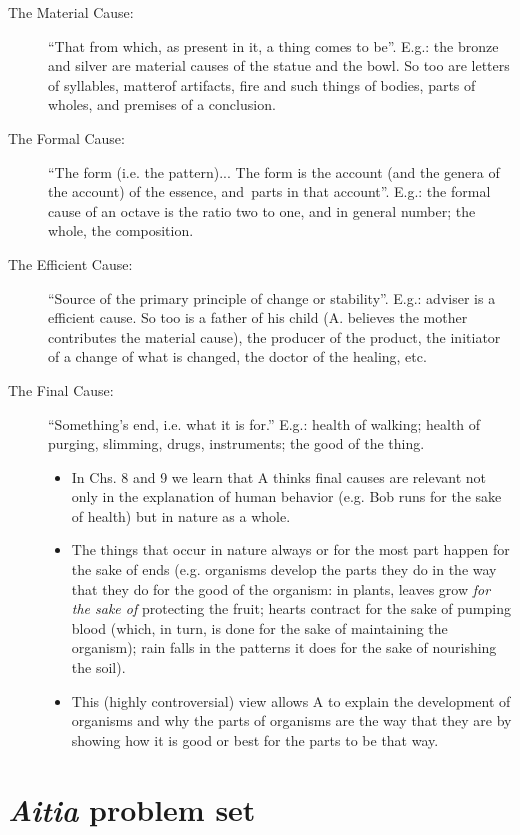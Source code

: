 \documentclass[oneside]{article}
\begin{document}
\begin{description}
\item[The Material Cause:] ``That from which, as present in it, a thing comes to be''. E.g.: the bronze and silver are material causes of the statue and the bowl. So too are letters of syllables, matterof artifacts, fire and such things of bodies, parts of wholes, and premises of a conclusion.
\item[The Formal Cause:] ``The form (i.e. the pattern)... The form is the account (and the genera of the account) of the essence, and\ parts in that account''. E.g.: the  formal cause of an octave is the ratio two to one, and in general number; the whole, the composition.
\item[The Efficient Cause:] ``Source of the primary principle of change or stability''. E.g.: adviser is a efficient cause. So too is a father of his child (A. believes the mother contributes the material cause), the producer of the product, the initiator of a change of what is changed, the doctor of the healing, etc.

\item [The Final Cause:] ``Something's end, i.e. what it is for.'' E.g.: health of walking; health of purging, slimming, drugs, instruments; the good of the thing.
\begin{itemize}
\item  In Chs. 8 and 9 we learn that A thinks final causes are relevant not only in the explanation of human behavior (e.g. Bob runs for the sake of health) but in nature as a whole.
\item The things that occur in nature always or for the most part happen for the sake of ends (e.g. organisms develop the parts they do in the way that they do for the good of the organism: in plants, leaves grow \emph{for the sake of} protecting the fruit; hearts contract for the sake of pumping blood (which, in turn, is done for the sake of maintaining the organism); rain falls in the patterns it does for the sake of nourishing the soil).
\item This (highly controversial) view allows A to explain the development of organisms and why the parts of organisms are the way that they are by showing how it is good or best for the parts to be that way.
\end{itemize}
\end{description}


\section*{\emph{Aitia} problem set}
\end{document}
